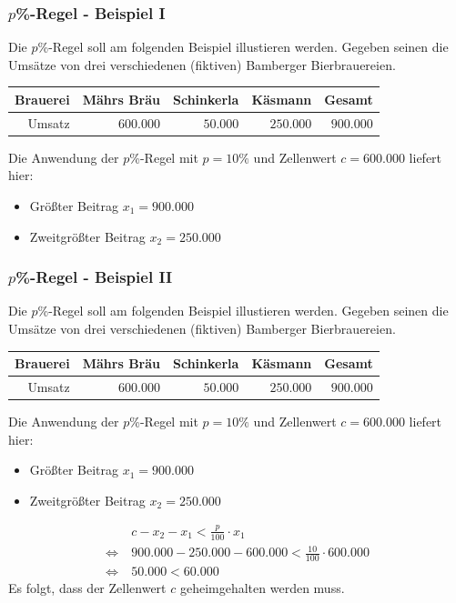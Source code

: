 \documentclass[aspectratio=169]{beamer}
\begin{document}
\begin{frame}
    \frametitle{$p$\%-Regel - Beispiel I}
    Die $p$\%-Regel soll am folgenden Beispiel illustieren werden. Gegeben seinen die Umsätze von drei verschiedenen (fiktiven) Bamberger Bierbrauereien.
    \begin{center}
        \begin{tabular}{ r r r r r }
            \textbf{Brauerei} \vline & \textbf{Mährs Bräu} & \textbf{Schinkerla} & \textbf{Käsmann} & \textbf{Gesamt} \\ 
            \hline
            Umsatz \vline & $600.000$ & $50.000$ & $250.000$ & $900.000$
           \end{tabular}
    \end{center}
    Die Anwendung der $p$\%-Regel mit $p = 10 \%$ und Zellenwert $c = 600.000$ liefert hier:
    \begin{itemize}
        \item Größter Beitrag $x_1 = 900.000$
        \item Zweitgrößter Beitrag $x_2 = 250.000$
    \end{itemize}
\end{frame}


\begin{frame}
    \frametitle{$p$\%-Regel - Beispiel II}
    Die $p$\%-Regel soll am folgenden Beispiel illustieren werden. Gegeben seinen die Umsätze von drei verschiedenen (fiktiven) Bamberger Bierbrauereien.
    \begin{center}
        \begin{tabular}{ r r r r r }
            \textbf{Brauerei} \vline & \textbf{Mährs Bräu} & \textbf{Schinkerla} & \textbf{Käsmann} & \textbf{Gesamt} \\ 
            \hline
            Umsatz \vline & $600.000$ & $50.000$ & $250.000$ & $900.000$
           \end{tabular}
    \end{center}
    Die Anwendung der $p$\%-Regel mit $p = 10 \%$ und Zellenwert $c = 600.000$ liefert hier:
    \begin{itemize}
        \item Größter Beitrag $x_1 = 900.000$
        \item Zweitgrößter Beitrag $x_2 = 250.000$
    \end{itemize}
    \begin{align}
        & c - x_2 - x_ 1 <  \frac{p}{100} \cdot x_1 \\
        \Leftrightarrow \: & 900.000 - 250.000 - 600.000 < \frac{10}{100} \cdot 600.000 \\
        \Leftrightarrow \: & 50.000 < 60.000
    \end{align}
    Es folgt, dass der Zellenwert $c$ geheimgehalten werden muss.
\end{frame}
\end{document}
